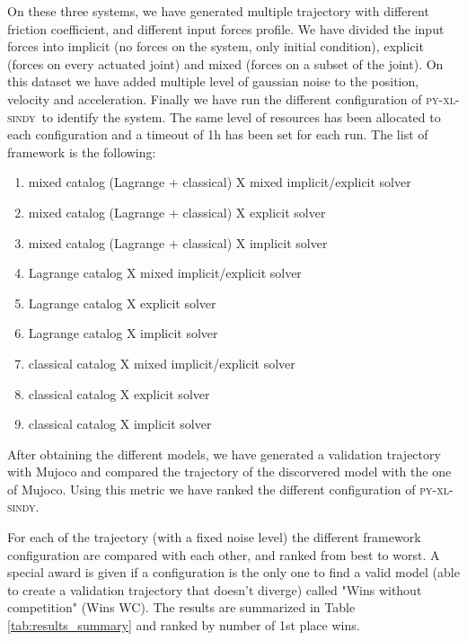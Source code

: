 \documentclass[12pt]{article}
\newcommand{\frameworkname}{\textsc{py-xl-sindy}}
\begin{document}
On these three systems, we have generated multiple trajectory with different friction coefficient, and different input forces profile. We have divided the input forces into implicit (no forces on the system, only initial condition), explicit (forces on every actuated joint) and mixed (forces on a subset of the joint). 
On this dataset we have added multiple level of gaussian noise to the position, velocity and acceleration. Finally we have run the different configuration of \frameworkname\ to identify the system. The same level of resources has been allocated to each configuration and a timeout of 1h has been set for each run.
The list of framework is the following: 
\begin{enumerate}
	\item mixed catalog (Lagrange + classical) X mixed implicit/explicit solver
	\item mixed catalog (Lagrange + classical) X explicit solver
	\item mixed catalog (Lagrange + classical) X implicit solver
	\item Lagrange catalog X mixed implicit/explicit solver
	\item Lagrange catalog X explicit solver
	\item Lagrange catalog X implicit solver
	\item classical catalog X mixed implicit/explicit solver
	\item classical catalog X explicit solver
	\item classical catalog X implicit solver 
\end{enumerate}

After obtaining the different models, we have generated a validation trajectory with Mujoco and compared the trajectory of the discorvered model with the one of Mujoco. Using this metric we have ranked the different configuration of \frameworkname. 

For each of the trajectory (with a fixed noise level) the different framework configuration are compared with each other, and ranked from best to worst. A special award is given if a configuration is the only one to find a valid model (able to create a validation trajectory that doesn't diverge) called "Wins without competition" (Wins WC). The results are summarized in Table \ref{tab:results_summary} and ranked by number of 1st place wins.
\end{document}
